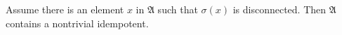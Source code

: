 
Assume there is an element $x$ in $\mathfrak{A}$ such that $\sigma(x)$ is disconnected. Then $\mathfrak{A}$ contains a nontrivial idempotent.
